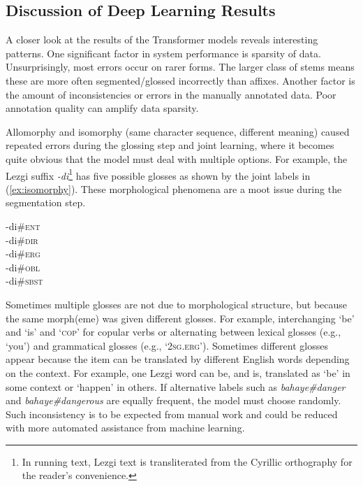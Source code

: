 \subsection{Discussion of Deep Learning Results}
\label{sec:sgDLanalysis}

A closer look at the results of the Transformer models reveals interesting patterns. One significant factor in system performance is sparsity of data. Unsurprisingly, most errors occur on rarer forms. The larger class of stems means these are more often segmented/glossed incorrectly than affixes. Another factor is the amount of inconsistencies or errors in the manually annotated data. Poor annotation quality can amplify data sparsity. 

Allomorphy and isomorphy (same character sequence, different meaning) caused repeated errors during the glossing step and joint learning, where it becomes quite obvious that the model must deal with multiple options. For example, the Lezgi suffix \textit{-di}\footnote{In running text, Lezgi text is transliterated from the Cyrillic orthography for the reader's convenience.} has five possible glosses as shown by the joint labels in (\ref{ex:isomorphy}). These morphological phenomena are a moot issue during the segmentation step. 

\pex   
\label{ex:isomorphy}
-di\#\textsc{ent} \\
-di\#\textsc{dir} \\
-di\#\textsc{erg} \\
-di\#\textsc{obl} \\
-di\#\textsc{sbst} 
\xe

Sometimes multiple glosses are not due to morphological structure, but because the same morph(eme) was given different glosses. For example, interchanging `be' and `is' and `\textsc{cop}' for copular verbs or alternating between lexical glosses (e.g., `you') and grammatical glosses (e.g., `\textsc{2sg.erg}'). Sometimes different glosses appear because the item can be translated by different English words depending on the context. For example, one Lezgi word can be, and is, translated as `be' in some context or `happen' in others. If alternative labels such as \textit{bahaye\#danger} and \textit{bahaye\#dangerous} are equally frequent, the model must choose randomly. Such inconsistency is to be expected from manual work and could be reduced with more automated assistance from machine learning.

